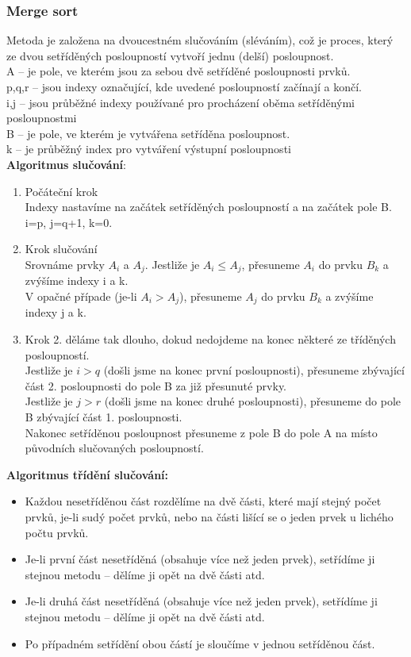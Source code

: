 \documentclass[10pt,a4paper]{article}
\begin{document}
\subsubsection{Merge sort}
Metoda je založena na dvoucestném slučováním (sléváním), což je proces, který ze dvou setříděných posloupností vytvoří jednu (delší) posloupnost. \\
A – je pole, ve kterém jsou za sebou dvě setříděné posloupnosti prvků. \\
p,q,r – jsou indexy označující, kde uvedené posloupností začínají a končí. \\
i,j – jsou průběžné indexy používané pro procházení oběma setříděnými posloupnostmi \\
B – je pole, ve kterém je vytvářena setříděna posloupnost. \\
k – je průběžný index pro vytváření výstupní posloupnosti \\
\textbf{Algoritmus slučování}:
\begin{enumerate}
	\item Počáteční krok \\
	Indexy nastavíme na začátek setříděných posloupností a na začátek pole B. i=p, j=q+1, k=0.
	\item Krok slučování \\
	Srovnáme prvky $A_i$ a $A_j$. Jestliže je $A_i \leq A_j$, přesuneme $A_i$ do prvku $B_k$ a zvýšíme indexy i a k. \\
	V opačné případe (je-li $A_i > A_j$), přesuneme $A_j$ do prvku $B_k$ a zvýšíme indexy j a k.
	\item Krok 2. děláme tak dlouho, dokud nedojdeme na konec některé ze tříděných posloupností. \\
	Jestliže je $i>q$ (došli jsme na konec první posloupnosti), přesuneme zbývající část 2. posloupnosti do pole B za již přesunuté prvky. \\
	Jestliže je $j>r$ (došli jsme na konec druhé posloupnosti), přesuneme do pole B zbývající část 1. posloupnosti. \\
	Nakonec setříděnou posloupnost přesuneme z pole B do pole A na místo původních slučovaných posloupností.
\end{enumerate}
\textbf{Algoritmus třídění slučování:}
\begin{itemize}
	\item Každou nesetříděnou část rozdělíme na dvě části, které mají stejný počet prvků, je-li sudý počet prvků, nebo na části lišící se o jeden prvek u lichého počtu prvků.
	\item Je-li první část nesetříděná (obsahuje více než jeden prvek), setřídíme ji stejnou metodu – dělíme ji opět na dvě části atd.
	\item Je-li druhá část nesetříděná (obsahuje více než jeden prvek), setřídíme ji stejnou metodu – dělíme ji opět na dvě části atd.
	\item Po případném setřídění obou částí je sloučíme v jednou setříděnou část.
\end{itemize}
\end{document}
